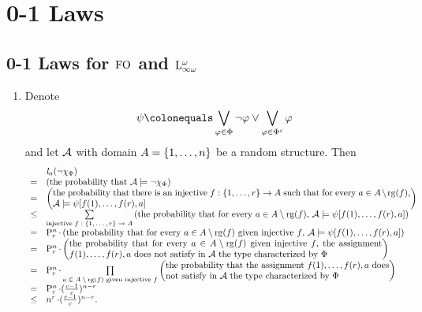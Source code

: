 \setcounter{chapter}{3}
\chapter{0-1 Laws}
\setcounter{section}{0}
\section{0-1 Laws for $\folog$ and $\inflog[\omega]$}
\begin{enumerate}[1.]
%
\item {} Denote
\[
\psi \defas \blor_{\varphi \in \Phi} \neg\varphi \lor \blor_{\varphi \in \cmpl{\Phi}} \varphi
\]
and let $\mathcal{A}$ with domain $A = {\{1, \ldots, n\}}$ be a random structure. Then
\[
\begin{array}{ll}
\    & \lprob[n](\neg\extaxm[\Phi]) \cr
=    & \paren{\mbox{the probability that \mathmode{\strct{A} \satis \neg\extaxm[\Phi]}}} \cr
=    & \paren{\parbox{40em}{the probability that there is an injective \mathmode{f : \sete{1, \etc, r} \to A} such that for every \mathmode{a \in A \setminus \rg(f)}, \mathmode{\strct{A} \satis \psi[f(1), \etc, f(r), a]}}} \cr
\leq & \sum\limits_{\text{injective \mathmode{f : \sete{1, \etc, r} \to A}}} \paren{\mbox{the probability that for every \mathmode{a \in A \setminus \rg(f)}, \mathmode{\strct{A} \satis \psi[f(1), \etc, f(r), a]}}} \cr
=    & \prmt{n}{r} \mul \paren{\mbox{the probability that for every \mathmode{a \in A \setminus \rg(f)} given injective \mathmode{f}, \mathmode{\strct{A} \satis \psi[f(1), \etc, f(r), a]}}} \cr
=    & \prmt{n}{r} \mul \paren{\parbox{35em}{the probability that for every \mathmode{a \in A \setminus \rg(f)} given injective \mathmode{f}, the assignment \mathmode{f(1), \etc, f(r), a} does not satisfy in \mathmode{\strct{A}} the type characterized by \mathmode{\Phi}}} \cr
=    & \prmt{n}{r} \mul \prod\limits_{\text{\mathmode{a \in A \setminus \rg(f)} given injective \mathmode{f}}} \paren{\parbox{25em}{the probability that the assignment \mathmode{f(1), \etc, f(r), a} does not satisfy in \mathmode{\strct{A}} the type characterized by \mathmode{\Phi}}} \cr
=    & \prmt{n}{r} \mul (\frac{c - 1}{c})^{n - r} \cr
\leq & n^r \mul (\frac{c - 1}{c})^{n - r}. \cr
\end{array}
\]


\end{enumerate}
